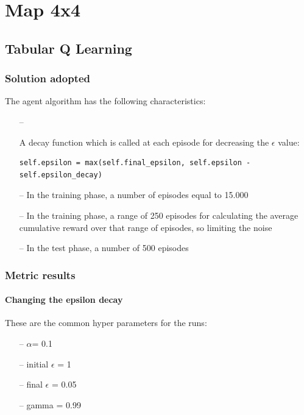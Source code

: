\documentclass{article}
\begin{document}
\section{Map 4x4}



\subsection{Tabular Q Learning}

\subsubsection{Solution adopted}

The agent algorithm has the following characteristics:
\begin{itemize}
\item[--] {A decay function which is called at each episode for decreasing the $\epsilon$ value:
\begin{verbatim}
self.epsilon = max(self.final_epsilon, self.epsilon - self.epsilon_decay)
\end{verbatim}
}
\item[--] In the training phase, a number of episodes equal to 15.000
\item[--] In the training phase, a range of 250 episodes for calculating the average cumulative reward over that range of episodes, so limiting the noise
\item[--] In the test phase, a number of 500 episodes
\end{itemize}

\subsubsection{Metric results}

\paragraph{Changing the epsilon decay}

These are the common hyper parameters for the runs:
\begin{itemize}
\item[--] $\alpha$= 0.1
\item[--] initial $\epsilon$ = 1
\item[--] final $\epsilon$ = 0.05
\item[--] gamma = 0.99
\end{itemize}
\end{document}
